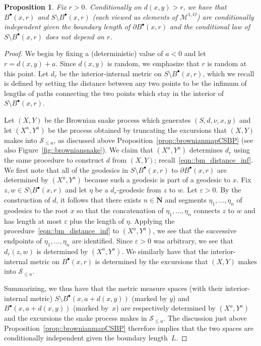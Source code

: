 \documentclass[JEP,XML,SOM,Unicode]{cedram}
\let\mathcal\mathscr
\newcommand{\sbullet}{{\scriptscriptstyle\bullet}}
\let\epsilon\varepsilon
\theoremstyle{plain}
\numberwithin{theorem}{section}
\newtheorem{proposition}[theorem]{Proposition}
\theoremstyle{definition}
\newcommand{\snake}{{\mathcal S}}
\newcommand\mmspace{{\mathcal M}}
\newcommand{\N}{\mathbf{N}}
\newcommand{\fb}[2]{B^\sbullet(#1,#2)}
\begin{document}
\begin{proposition}
\label{prop::metric_net_law}
Fix $r > 0$. Conditionally on $d(x,y) > r$, we have that $\fb{x}{r}$ and $S \setminus \fb{x}{r}$ (each viewed as elements of $\mmspace^{1,O}$) are conditionally independent given the boundary length of $\partial \fb{x}{r}$ and the conditional law of $S \setminus \fb{x}{r}$ does not depend on $r$.
\end{proposition}
\begin{proof}
We begin by fixing a (deterministic) value of $a < 0$ and let $r = d(x,y)+a$. Since $d(x,y)$ is random, we emphasize that $r$ is random at this point. Let $d_r$ be the interior-internal metric on $S \setminus \fb{x}{r}$, which we recall is defined by setting the distance between any two points to be the infimum of lengths of paths connecting the two points which stay in the interior of $S \setminus \fb{x}{r}$.

Let $(X,Y)$ be the Brownian snake process which generates $(S,d,\nu,x,y)$ and let $(X^a,Y^a)$ be the process obtained by truncating the excursions that $(X,Y)$ makes into $\snake_{\leq a}$, as discussed above Proposition~\ref{prop::brownianmapCSBP} (see also Figure~\ref{fig::browniansnake}). We claim that $(X^a,Y^a)$ determines $d_r$ using the same procedure to construct $d$ from $(X,Y)$; recall~\eqref{eqn::bm_distance_inf}. We first note that all of the geodesics in $S \setminus \fb{x}{r}$ to $\partial \fb{x}{r}$ are determined by $(X^a,Y^a)$ because such a geodesic is part of a geodesic to $x$. Fix $z, w \in S \setminus \fb{x}{r}$ and let $\eta$ be a $d_r$-geodesic from $z$ to $w$. Let $\epsilon > 0$. By the construction of $d$, it follows that there exists $n \in \N$ and segments $\eta_1,\ldots,\eta_n$ of geodesics to the root $x$ so that the concatenation of $\eta_1,\ldots,\eta_n$ connects $z$ to $w$ and has length at most $\epsilon$ plus the length of $\eta$. Applying the procedure~\eqref{eqn::bm_distance_inf} to $(X^a,Y^a)$, we see that the successive endpoints of $\eta_1,\ldots,\eta_n$ are identified. Since $\epsilon > 0$ was arbitrary, we see that $d_r(z,w)$ is determined by $(X^a,Y^a)$. We similarly have that the interior-internal metric on $\fb{x}{r}$ is determined by the excursions that $(X,Y)$ makes into $\snake_{\leq a}$.

Summarizing, we thus have that the metric measure spaces (with their interior-internal metric) $S \setminus \fb{x}{a+d(x,y)}$ (marked by $y$) and $\fb{x}{a+d(x,y)}$ (marked by~$x$) are respectively determined by $(X^a,Y^a)$ and the excursions the snake process makes in $\snake_{\leq a}$. The discussion just above Proposition~\ref{prop::brownianmapCSBP} therefore implies that the two spaces are conditionally independent given the boundary length~$L$.


\end{proof}
\end{document}
